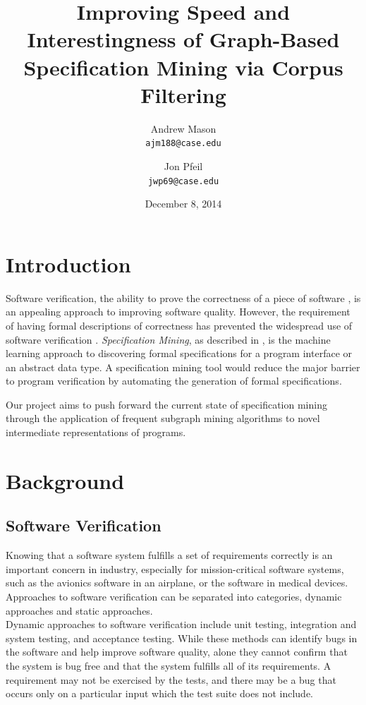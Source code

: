 \documentclass[12pt]{article}
\title{Improving Speed and Interestingness of Graph-Based Specification Mining via Corpus Filtering}
\author{
    Andrew Mason\\
    \texttt{ajm188@case.edu}
    \and
    Jon Pfeil\\
    \texttt{jwp69@case.edu}
}
\date{December 8, 2014}
\begin{document}
\maketitle
\tableofcontents
\pagebreak

\section{Introduction}
Software verification, the ability to prove the correctness of a piece of software \cite{FormalSoftwareVerification}, is an appealing approach to improving software quality. However, the requirement of having formal descriptions of correctness has prevented the widespread use of software verification \cite{Ammons:2002:MS:503272.503275}. \textit{Specification Mining}, as described in \cite{Ammons:2002:MS:503272.503275}, is the machine learning approach to discovering formal specifications for a program interface or an abstract data type. A specification mining tool would reduce the major barrier to program verification by automating the generation of formal specifications.

Our project aims to push forward the current state of specification mining through the application of frequent subgraph mining algorithms to novel intermediate representations of programs.

\section{Background}
\subsection{Software Verification}
Knowing that a software system fulfills a set of requirements correctly is an
important concern in industry, especially for mission-critical software
systems, such as the avionics software in an airplane, or the software in
medical devices. Approaches to software verification can be separated into
categories, dynamic approaches and static approaches.
\\

\noindent Dynamic approaches to software verification include unit testing,
integration and system testing, and acceptance testing. While these methods 
can identify bugs in the software and help improve software quality, alone they
cannot confirm that the system is bug free and that the system fulfills all of
its requirements. A requirement may not be exercised by the tests, and there
may be a bug that occurs only on a particular input which the test suite does
not include.
\\
\end{document}
